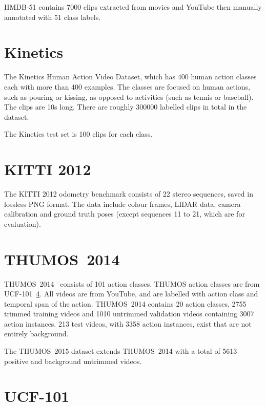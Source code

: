 \documentclass[a4paper, 12pt]{article}
\begin{document}
HMDB-51 contains 7000 clips extracted from movies and YouTube then manually
annotated with 51 class labels.


\section{Kinetics~\citet{kay2017kinetics}}
\label{kinetics}

The Kinetics Human Action Video Dataset\citet{kay2017kinetics}, which has 400
human action classes each with more than 400 examples. The classes are focused
on human actions, such as pouring or kissing, as opposed to activities (such as
tennis or baseball). The clips are 10s long. There are roughly \num{300000}
labelled clips in total in the dataset.

The Kinetics test set is 100 clips for each class.


\section{KITTI 2012~\citet{geiger-kitti-2012}}
\label{kitti}

The KITTI 2012 odometry benchmark consists of 22 stereo sequences, saved in
lossless PNG format. The data include colour frames, LIDAR data, camera
calibration and ground truth poses (except sequences 11 to 21, which are for
evaluation).


\section{THUMOS~2014~\citet{DBLP:journals/corr/IdreesZJGLSS16}}
\label{thumos}

THUMOS~2014~\citet{DBLP:journals/corr/IdreesZJGLSS16} consists of 101 action
classes. THUMOS action classes are from UCF-101~\ref{ucf101}. All videos are
from YouTube, and are labelled with action class and temporal span of the
action. THUMOS~2014 contains 20 action classes, 2755 trimmed training videos
and 1010 untrimmed validation videos containing 3007 action instances. 213 test
videos, with 3358 action instances, exist that are not entirely background.

The THUMOS~2015 dataset extends THUMOS~2014 with a total of 5613 positive and
background untrimmed videos.


\section{UCF-101\citet{DBLP:journals/corr/abs-1212-0402}}
\label{ucf101}
\end{document}
